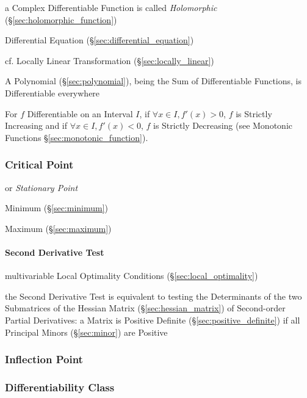 a Complex Differentiable Function is called \emph{Holomorphic}
(\S\ref{sec:holomorphic_function})

\fist Differential Equation (\S\ref{sec:differential_equation})

\fist cf. Locally Linear Transformation (\S\ref{sec:locally_linear})

A Polynomial (\S\ref{sec:polynomial}), being the Sum of Differentiable
Functions, is Differentiable everywhere

For $f$ Differentiable on an Interval $I$, if $\forall x \in I, f'(x)
> 0$, $f$ is Strictly Increasing and if $\forall x \in I, f'(x) < 0$,
$f$ is Strictly Decreasing (see Monotonic Functions
\S\ref{sec:monotonic_function}).



\subsubsection{Critical Point}\label{sec:critical_point}

or \emph{Stationary Point}

Minimum (\S\ref{sec:minimum})

Maximum (\S\ref{sec:maximum})



\paragraph{Second Derivative Test}\label{sec:second_derivative_test}\hfill

\fist multivariable Local Optimality Conditions (\S\ref{sec:local_optimality})

the Second Derivative Test is equivalent to testing the Determinants of the two
Submatrices of the Hessian Matrix (\S\ref{sec:hessian_matrix}) of Second-order
Partial Derivatives: a Matrix is Positive Definite
(\S\ref{sec:positive_definite}) if all Principal Minors (\S\ref{sec:minor}) are
Positive



\subsubsection{Inflection Point}\label{sec:inflection_point}

\subsubsection{Differentiability Class}\label{sec:differentiability_class}

